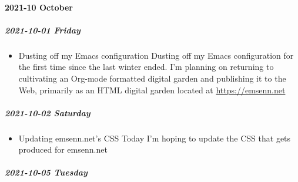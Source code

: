 \documentclass[11pt]{article}
\begin{document}
\paragraph*{2021-10 October}
\label{sec:org7d3381f}
\startcontents[level-4]
\subparagraph*{2021-10-01 Friday}
\label{sec:orgc0b940c}
\begin{itemize}
\item Dusting off my Emacs configuration
\label{sec:org4fc27db}
Dusting off my Emacs configuration for the first time since the last winter ended. I'm planning on returning to cultivating an Org-mode formatted digital garden and publishing it to the Web, primarily as an HTML digital garden located at \url{https://emsenn.net}
\end{itemize}
\subparagraph*{2021-10-02 Saturday}
\label{sec:org88c63d1}
\begin{itemize}
\item Updating emsenn.net's CSS
\label{sec:orge668225}
Today I'm hoping to update the CSS that gets produced for emsenn.net
\end{itemize}
\subparagraph*{2021-10-05 Tuesday}
\label{sec:org3ac1ce6}
\end{document}

